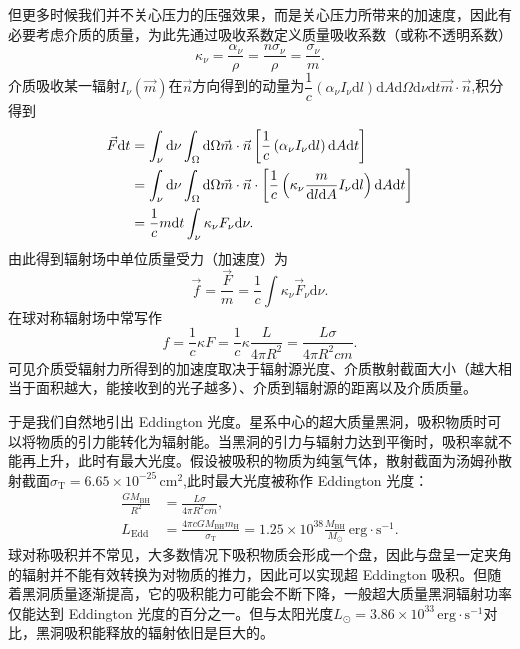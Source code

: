 \documentclass[../天体物理基础.tex]{subfiles}
\begin{document}
但更多时候我们并不关心压力的压强效果，而是关心压力所带来的加速度，因此有必要考虑介质的质量，为此先通过吸收系数定义质量吸收系数（或称不透明系数）
\begin{equation}
\kappa_\nu=\frac{\alpha_\nu}\rho=\frac{n\sigma_{\nu}}{\rho}=\frac{\sigma_\nu}{m}.
\end{equation}
介质吸收某一辐射$I_{\nu}\left(\vec{m}\right)$在$\vec n$方向得到的动量为$\dfrac{1}{c}\left(\alpha_\nu I_\nu\mathrm{d}l\right)\mathrm{d}A\mathrm{d}\Omega\mathrm{d}\nu\mathrm{d}t\vec{m}\cdot\vec{n}$,积分得到
\begin{align}
\vec{F}\mathrm{d}t&=\int_{\nu}\mathrm{d}\nu\int_{\Omega}\mathrm{d}\Omega\vec{m}\cdot\vec{n}\left[\frac{1}{c}\left(\alpha_{\nu}I_{\nu}\mathrm{d}l\right)\mathrm{d}A\mathrm{d}t\right]\notag\\
&=\int_{\nu}\mathrm{d}\nu\int_{\Omega}\mathrm{d}\Omega\vec{m}\cdot\vec{n}\cdot\left[\frac{1}{c}\left(\kappa_{\nu}\frac{m}{\mathrm{d}l\mathrm{d}A}I_{\nu}\mathrm{d}l\right)\mathrm{d}A\mathrm{d}t\right]\notag\\
&=\frac{1}{c}m\mathrm{d}t\int_{\nu}\kappa_{\nu}F_{\nu}\mathrm{d}\nu.
\end{align}
由此得到辐射场中单位质量受力（加速度）为
\begin{equation}
\vec{f}=\frac{\vec{F}}{m}=\frac{1}{c}\int\kappa_{\nu}\vec{F}_{\nu}\mathrm{d}\nu.
\end{equation}
在球对称辐射场中常写作
\begin{equation}
f=\frac{1}{c}\kappa F=\frac{1}{c}\kappa\dfrac{L}{4\pi R^2}=\frac{L\sigma}{4\pi R^{2}cm}.
\end{equation}
可见介质受辐射力所得到的加速度取决于辐射源光度、介质散射截面大小（越大相当于面积越大，能接收到的光子越多）、介质到辐射源的距离以及介质质量。

于是我们自然地引出 Eddington 光度。星系中心的超大质量黑洞，吸积物质时可以将物质的引力能转化为辐射能。当黑洞的引力与辐射力达到平衡时，吸积率就不能再上升，此时有最大光度。假设被吸积的物质为纯氢气体，散射截面为汤姆孙散射截面$\sigma_{\text{T}}=6.65\times10^{-25}\,\mathrm{cm}^{2}$,此时最大光度被称作 Eddington 光度：
\begin{align}
\frac{GM_{\text{BH}}}{R^{2}}&=\frac{L\sigma}{4\pi R^{2}cm},\\
L_{\text{Edd}}&=\frac{4\pi cGM_{\text{BH}}m_{\mathrm{H}}}{\sigma_{\text{T}}}=1.25\times10^{38}\frac{M_{\text{BH}}}{M_\odot}\,\mathrm{erg\cdot{}s^{-1}}.
\end{align}
球对称吸积并不常见，大多数情况下吸积物质会形成一个盘，因此与盘呈一定夹角的辐射并不能有效转换为对物质的推力，因此可以实现超 Eddington 吸积。但随着黑洞质量逐渐提高，它的吸积能力可能会不断下降，一般超大质量黑洞辐射功率仅能达到 Eddington 光度的百分之一。但与太阳光度$L_{\odot}=3.86\times10^{33}\,\mathrm{erg\cdot s^{-1}}$对比，黑洞吸积能释放的辐射依旧是巨大的。
\end{document}
